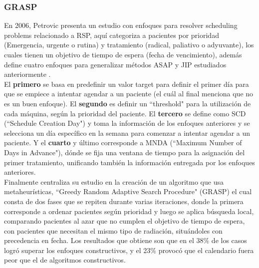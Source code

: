 \documentclass[letter, 10pt]{article}
\begin{document}
    \subsubsection{GRASP}
    En 2006, Petrovic \cite{cinco} presenta un estudio con enfoques para resolver scheduling problems relacionado a RSP, aquí categoriza a pacientes por prioridad (Emergencia, urgente o rutina) y tratamiento (radical, paliativo o adyuvante), los cuales tienen un objetivo de tiempo de espera (fecha de vencimiento), además define cuatro enfoques para generalizar métodos ASAP y JIP estudiados anteriormente \cite{seis}.
    \\El \textbf{primero} se basa en predefinir un valor target para definir el primer día para que se empiece a intentar agendar a un paciente (el cuál al final menciona que no es un buen enfoque). El \textbf{segundo} es definir un ``threshold" para la utilización de cada máquina, según la prioridad del paciente. El \textbf{tercero} se define como SCD (``Schedule Creation Day") y toma la información de los enfoques anteriores y se selecciona un día específico en la semana para comenzar a intentar agendar a un paciente. Y el \textbf{cuarto} y último corresponde a MNDA (``Maximum Number of Days in Advance"), dónde se fija una ventana de tiempo para la asignación del primer tratamiento, unificando también la información entregada por los enfoques anteriores.
    \\Finalmente centraliza su estudio en la creación de un algoritmo que usa metaheurísticas, ``Greedy Random Adaptive Search Procedure" (GRASP) el cual consta de dos fases que se repiten durante varias iteraciones, donde la primera corresponde a ordenar pacientes según prioridad y luego se aplica búsqueda local, comparando pacientes al azar que no cumplen el objetivo de tiempo de espera, con pacientes que necesitan el mismo tipo de radiación, situándoles con precedencia en fecha. 
    Los resultados que obtiene son que en el 38\% de los casos logró superar los enfoques constructivos, y el 23\% provocó que el calendario fuera peor que el de algoritmos constructivos. 
\end{document}
